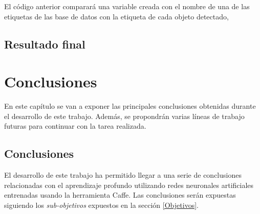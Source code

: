 \documentclass[a4paper, 12pt, oneside]{book}
\begin{document}
El código anterior comparará una variable creada con el nombre de una de las etiquetas de las base de datos con la etiqueta de cada objeto detectado, 

\section{Resultado final}


\chapter{Conclusiones}

En este capítulo se van a exponer las principales conclusiones obtenidas durante el desarrollo de este trabajo. Además, se propondrán varias líneas de trabajo futuras para continuar con la tarea realizada.

\section{Conclusiones}

El desarrollo de este trabajo ha permitido llegar a una serie de conclusiones relacionadas con el aprendizaje profundo utilizando redes neuronales artificiales entrenadas usando la herramienta Caffe. Las conclusiones serán expuestas siguiendo los \textit{sub-objetivos} expuestos en la sección \ref{Objetivos}.
\end{document}
